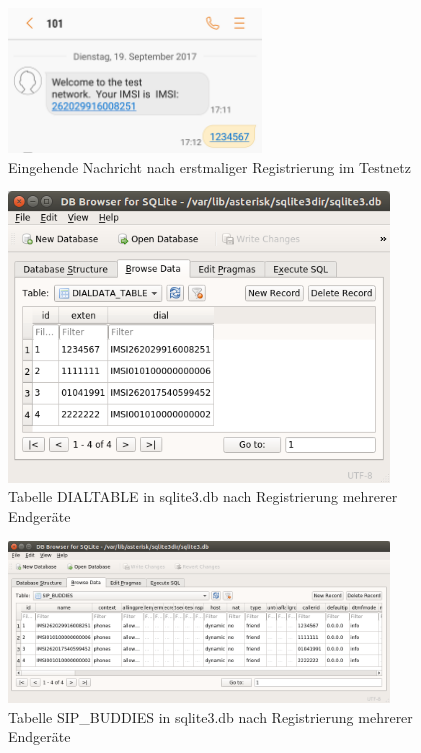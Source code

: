 \begin{figure}[htbp]
	\centering
		\includegraphics[width=0.6\textwidth]{includes/openbts_registration}
	\caption{Eingehende Nachricht nach erstmaliger Registrierung im Testnetz}
	\label{fig:openbts_registration}
\end{figure}

\begin{figure}[htbp]
	\centering
		\includegraphics[width=0.9\textwidth]{includes/DB_asterisk_dialtable}
	\caption{Tabelle DIALTABLE in sqlite3.db nach Registrierung mehrerer Endgeräte}
	\label{fig:asterisk_dialtable}
\end{figure}

\begin{figure}[htbp]
	\centering
		\includegraphics[width=0.9\textwidth]{includes/DB_asterisk_SipBuddies}
	\caption{Tabelle SIP\_BUDDIES in sqlite3.db nach Registrierung mehrerer Endgeräte}
	\label{fig:asterisk_sipbuddies}
\end{figure}

